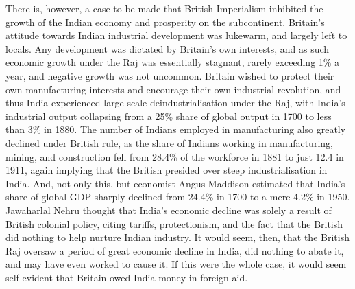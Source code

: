    There is, however, a case to be made that British Imperialism inhibited
   the growth of the Indian economy and prosperity on the subcontinent.
   Britain's attitude towards Indian industrial development was lukewarm,
   and largely left to locals. Any development was dictated by Britain's
   own interests, and as such economic growth under the Raj was
   essentially stagnant, rarely exceeding 1\% a year, and negative growth
   was not uncommon. Britain wished to protect their own manufacturing
   interests and encourage their own industrial revolution, and thus India
   experienced large-scale deindustrialisation under the Raj, with India's
   industrial output collapsing from a 25\% share of global output in 1700
   to less than 3\% in 1880. The number of Indians employed in
   manufacturing also greatly declined under British rule, as the share of
   Indians working in manufacturing, mining, and construction fell from
   28.4\% of the workforce in 1881 to just 12.4 in 1911, again implying
   that the British presided over steep industrialisation in India. And,
   not only this, but economist Angus Maddison estimated that India's
   share of global GDP sharply declined from 24.4\% in 1700 to a mere 4.2\%
   in 1950. Jawaharlal Nehru thought that India's economic decline was
   solely a result of British colonial policy, citing tariffs,
   protectionism, and the fact that the British did nothing to help
   nurture Indian industry. It would seem, then, that the British Raj
   oversaw a period of great economic decline in India, did  nothing to
   abate it, and may have even worked to cause it. If this were the whole
   case, it would seem self-evident that Britain owed India money in
   foreign aid.


